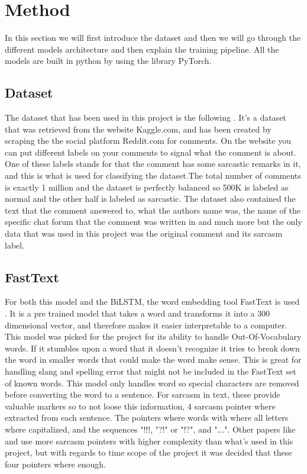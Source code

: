 \documentclass[
 reprint,
 amsmath,amssymb,
 aps,
]{revtex4-2}
\begin{document}



\section{\label{sec:method}Method} %
In this section we will first introduce the dataset and then we will go through the different models architecture and then explain the training pipeline. All the models are built in python by using the library PyTorch.
\subsection{Dataset}
The dataset that has been used in this project is the following \cite{SARC}. It's a dataset that was retrieved from the website Kaggle.com, and has been created by scraping the the social platform Reddit.com for comments. On the website you can put different labels on your comments to signal what the comment is about. One of these labels stands for that the comment has some sarcastic remarks in it, and this is what is used for classifying the dataset.The total number of comments is exactly 1 million and the dataset is perfectly balanced so 500K is labeled as normal and the other half is labeled as sarcastic. The dataset also contained the text that the comment answered to, what the authors name was, the name of the specific chat forum that the comment was written in and much more but the only data that was used in this project was the original comment and its sarcasm label.
\subsection{FastText}
For both this model and the BiLSTM, the word embedding tool FastText is used \cite{grave2018learning}. It is a pre trained model that takes a word and transforms it into a 300 dimensional vector, and therefore makes it easier interpretable to a computer. This model was picked for the project for its ability to handle Out-Of-Vocabulary words. If it stumbles upon a word that it doesn't recognize it tries to break down the word in smaller words that could make the word make sense. This is great for handling slang and spelling error that might not be included in the FastText set of known words. This model only handles word so special characters are removed before converting the word to a sentence. For sarcasm in text, these provide valuable markers so to not loose this information, 4 sarcasm pointer where extracted from each sentence. The pointers where words with where all letters where capitalized, and the sequences "!!!, "?!" or "!?", and "...". Other papers like \cite{9420094} and \cite{KumarEtAl2021} use more sarcasm pointers with higher complexity than what's used in this project, but with regards to time scope of the project it was decided that these four pointers where enough.
\end{document}
